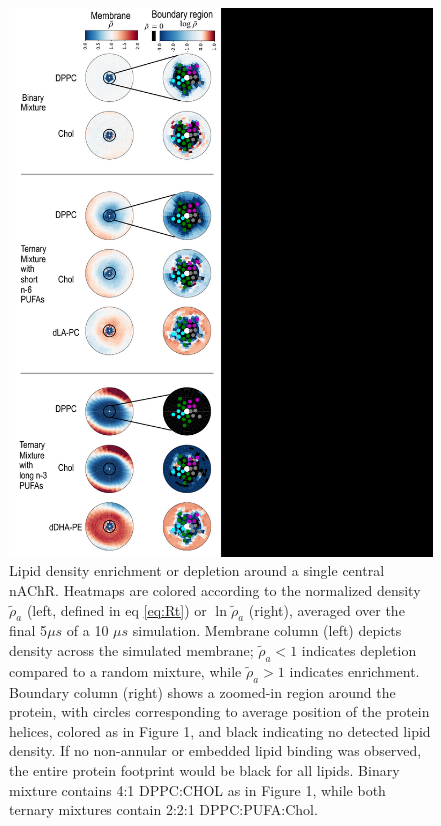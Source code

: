 \documentclass[final,3p,times,twocolumn]{elsarticle}
\begin{document}
	\begin{figure}[ht!]
		\center
		\includegraphics[width=.75\linewidth]{ComparativeHeatMap.pdf}
		\caption{Lipid density enrichment or depletion around a single central nAChR.  Heatmaps are colored according to the normalized density $\tilde{\rho}_{a}$ (left, defined in eq \ref{eq:Rt}) or $\ln\tilde{\rho}_{a}$ (right), averaged over the final 5$\mu s$ of a 10 $\mu s$ simulation. Membrane column (left) depicts density across the simulated membrane; $\tilde{\rho}_{a}<1$ indicates depletion compared to a random mixture, while $\tilde{\rho}_{a}>1$ indicates enrichment. Boundary column (right) shows a zoomed-in region around the protein, with circles corresponding to average position of the protein helices, colored as in Figure 1, and black indicating no detected lipid density. If no non-annular or embedded lipid binding was observed, the entire protein footprint would be black for all lipids. Binary mixture contains 4:1 DPPC:CHOL as in Figure 1, while both ternary mixtures contain 2:2:1 DPPC:PUFA:Chol. }
		\label{fig:sorting}
	\end{figure}
	
\end{document}
